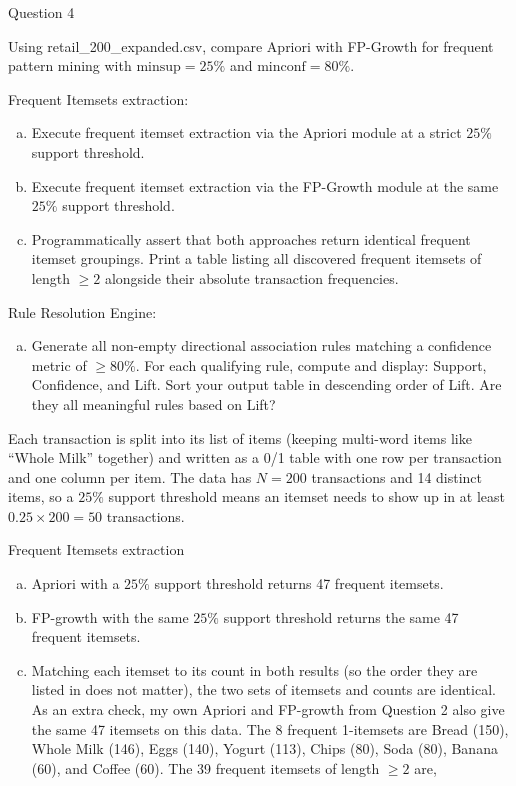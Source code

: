 \documentclass[12pt,letterpaper, onecolumn]{exam}
\newcommand{\minsup}{\mathrm{minsup}}
\newcommand{\minconf}{\mathrm{minconf}}
\begin{document}
\begin{questions}
    \newpage
    \question Question 4

    Using retail\_200\_expanded.csv, compare Apriori with FP-Growth for frequent pattern mining with $\minsup = 25\%$ and $\minconf = 80\%$.

    Frequent Itemsets extraction:
    \begin{enumerate}[a.)]
        \item Execute frequent itemset extraction via the Apriori module at a strict $25\%$ support threshold.
        \item Execute frequent itemset extraction via the FP-Growth module at the same $25\%$ support threshold.
        \item Programmatically assert that both approaches return identical frequent itemset groupings. Print a table listing all discovered frequent itemsets of length $\geq 2$ alongside their absolute transaction frequencies.
    \end{enumerate}
    Rule Resolution Engine:
    \begin{enumerate}[a.)]
        \item Generate all non-empty directional association rules matching a confidence metric of $\geq 80\%$. For each qualifying rule, compute and display: Support, Confidence, and Lift. Sort your output table in descending order of Lift. Are they all meaningful rules based on Lift?
    \end{enumerate}

    \begin{solution}

        Each transaction is split into its list of items (keeping multi-word items like ``Whole Milk'' together) and written as a 0/1 table with one row per transaction and one column per item. The data has $N=200$ transactions and 14 distinct items, so a $25\%$ support threshold means an itemset needs to show up in at least $0.25\times200=50$ transactions.

        Frequent Itemsets extraction
        \begin{enumerate}[a.)]
            \item Apriori with a $25\%$ support threshold returns 47 frequent itemsets.
            \item FP-growth with the same $25\%$ support threshold returns the same 47 frequent itemsets.
            \item Matching each itemset to its count in both results (so the order they are listed in does not matter), the two sets of itemsets and counts are identical. As an extra check, my own Apriori and FP-growth from Question 2 also give the same 47 itemsets on this data. The 8 frequent 1-itemsets are Bread (150), Whole Milk (146), Eggs (140), Yogurt (113), Chips (80), Soda (80), Banana (60), and Coffee (60). The 39 frequent itemsets of length $\geq2$ are,
        \end{enumerate}


\end{solution}
\end{questions}
\end{document}
